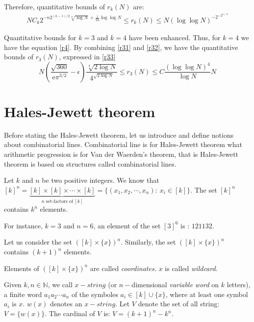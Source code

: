 Therefore, quantitative bounds of $r_k(N)$ are:
\begin{align}
NC_k 2^{-n2^{(n-1)/2} \sqrt[n]{\log N} +\frac{1}{2n} \log \log N } \leq r_k(N) \leq N\left(\log \log N\right)^{-2^{-2^{k+9}}}
\end{align}

Quantitative bounds for  $k=3$  and $k=4$ have been enhanced. Thus, for $k=4$ we have the equation \eqref{r4}. By combining  \eqref{r31} and \eqref{r32}, we have the quantitative bounds of $r_3(N)$, expressed in \eqref{r33}
\begin{equation}
N \left( \frac{\sqrt{360}}{\mathrm{e}\pi^{3/2}}-\epsilon \right) \frac{\sqrt[4]{2\log N}}{4^{\sqrt{2\log N}}} \leq r_3(N) \leq C \frac{(\log \log N)^4}{\log N} N  \label{r33}
\end{equation}

\section{Hales-Jewett theorem}

Before stating the Hales-Jewett theorem, let us introduce and define notions about combinatorial lines.  Combinatorial line is for Hales-Jewett theorem what arithmetic progression is for Van der Waerden's theorem, that is Hales-Jewett theorem is based on structures called combinatorial lines.

Let $k$ and $n$  be two positive integers. We know that $[k]^n= \underbrace{[k] \times [k] \times \cdots \times [k]}_{n \text{ set-factors  of}\  [k]}=\{(x_1,x_2,\cdots, x_n):\ x_i \in [k] \}.$ The set $[k]^n$ contains $k^n$ elements.

For instance, $k=3$ and $n=6$, an element of the set $[3]^6$ is : $121132.$

Let us consider the set $([k]\times \{x\})^n.$ Similarly, the set $([k]\times \{x\})^n$ contains $(k+1)^n$ elements.

Elements of $([k]\times \{x\})^n$ are called \textit{coordinates.} $x$ is called \textit{wildcard.}


Given ${k,n\in{\mathbb N}}$, we call $x-string$ (or ${n}-$dimensional \textit{variable word} on ${k}$ letters),  a finite word $a_1a_2\cdots a_n$ of the symboles $a_i \in [k] \cup \{x\}$, where at least one symbol $a_i$ is $x.$ $w(x)$ denotes an $x-string.$ Let $V$ denote  the set of all string: $V=\{w(x)\}$. The cardinal of $V$ is: $V=(k+1)^n-k^n.$ 


